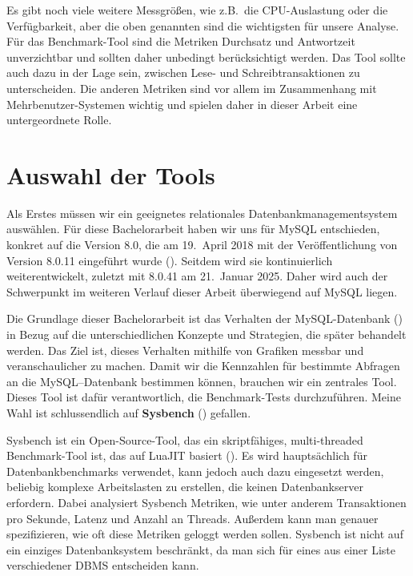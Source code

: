 Es gibt noch viele weitere Messgrößen, wie z.B.\ die CPU-Auslastung oder die Verfügbarkeit, aber die oben genannten sind die wichtigsten für unsere Analyse.
Für das Benchmark-Tool sind die Metriken Durchsatz und Antwortzeit unverzichtbar und sollten daher unbedingt berücksichtigt werden.
Das Tool sollte auch dazu in der Lage sein, zwischen Lese- und Schreibtransaktionen zu unterscheiden.
Die anderen Metriken sind vor allem im Zusammenhang mit Mehrbenutzer-Systemen wichtig und spielen daher in dieser Arbeit eine untergeordnete Rolle.

\section{Auswahl der Tools}\label{sec:auswahl-der-tools}

Als Erstes müssen wir ein geeignetes relationales Datenbankmanagementsystem auswählen.
Für diese Bachelorarbeit haben wir uns für MySQL entschieden, konkret auf die Version 8.0, die am 19.\ April 2018 mit der Veröffentlichung von Version 8.0.11 eingeführt wurde (\cite{mysql_release}).
Seitdem wird sie kontinuierlich weiterentwickelt, zuletzt mit 8.0.41 am 21.\ Januar 2025.
Daher wird auch der Schwerpunkt im weiteren Verlauf dieser Arbeit überwiegend auf MySQL liegen.

Die Grundlage dieser Bachelorarbeit ist das Verhalten der MySQL-Datenbank (\cite{sysbench_mysql}) in Bezug auf die unterschiedlichen Konzepte und Strategien, die später behandelt werden.
Das Ziel ist, dieses Verhalten mithilfe von Grafiken messbar und veranschaulicher zu machen.
Damit wir die Kennzahlen für bestimmte Abfragen an die MySQL–Datenbank bestimmen können, brauchen wir ein zentrales Tool.
Dieses Tool ist dafür verantwortlich, die Benchmark-Tests durchzuführen.
Meine Wahl ist schlussendlich auf \textbf{Sysbench} (\cite{sysbench_repo}) gefallen.

Sysbench ist ein Open-Source-Tool, das ein skriptfähiges, multi-threaded Benchmark-Tool ist, das auf LuaJIT basiert (\cite[pp. 50--66]{schwartz2012high}).
Es wird hauptsächlich für Datenbankbenchmarks verwendet, kann jedoch auch dazu eingesetzt werden, beliebig komplexe Arbeitslasten zu erstellen, die keinen Datenbankserver erfordern.
Dabei analysiert Sysbench Metriken, wie unter anderem Transaktionen pro Sekunde, Latenz und Anzahl an Threads.
Außerdem kann man genauer spezifizieren, wie oft diese Metriken geloggt werden sollen.
Sysbench ist nicht auf ein einziges Datenbanksystem beschränkt, da man sich für eines aus einer Liste verschiedener DBMS entscheiden kann.

